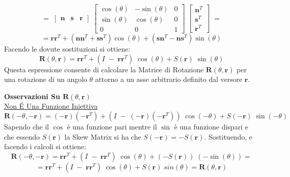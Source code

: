 ﻿\documentclass[11pt, a4paper]{article}
\begin{document}
\[
    =
    \;
    \begin{bmatrix}
        \mathbf{n} & \mathbf{s} & \mathbf{r}
    \end{bmatrix}
    \;
    \begin{bmatrix}
       \cos(\theta) & -\sin(\theta) & 0 \\
       \sin(\theta) &  \cos(\theta) & 0 \\
       0 & 0 & 1
    \end{bmatrix}
    \;
    \begin{bmatrix}
        \mathbf{n}^{T}\\
        \mathbf{s}^{T}\\
        \mathbf{r}^{T}
    \end{bmatrix}
    \;
    =
\]
\[
    = \mathbf{r}\mathbf{r}^{T} + (\mathbf{n}\mathbf{n}^{T} + \mathbf{s}\mathbf{s}^{T})\cos(\theta) + (\mathbf{s}\mathbf{n}^{T} - \mathbf{n}\mathbf{s}^{T})\sin(\theta)
\]
Facendo le dovute sostituzioni si ottiene:
\[
    \boxed{\mathbf{R}(\theta, \mathbf{r}) = \mathbf{r}\mathbf{r}^{T} + (I \; - \; \mathbf{r}\mathbf{r}^{T}) \; \cos(\theta) + S(\mathbf{r}) \; \sin(\theta)}
\]
Questa espressione consente di calcolare la Matrice di Rotazione \(\mathbf{R}(\theta, \mathbf{r})\) per una rotazione di un angolo \(\theta\) attorno a un asse arbitrario definito dal versore \(\mathbf{r}\).

\newpage
\textbf{Osservazioni Su \(\mathbf{R}(\theta, \mathbf{r})\)}\\

\underline{Non É Una Funzione Iniettiva}
\[
    \mathbf{R}(-\theta, -\mathbf{r}) =  (-\mathbf{r})(-\mathbf{r}^{T}) + (I \; - \; (-\mathbf{r})(-\mathbf{r}^{T})) \; \cos(-\theta) + S(\mathbf{-r}) \; \sin(-\theta)
\]
Sapendo che il $\cos$ è una funzione pari mentre il $\sin$ è una funzione dispari e che essendo $S(\mathbf{r})$ la Skew Matrix si ha che $S(\mathbf{-r}) = - S(\mathbf{r})$. Sostituendo, e facendo i calcoli si ottiene:
\[
    \mathbf{R}(-\theta, -\mathbf{r}) =  \mathbf{r}\mathbf{r}^{T} + (I \; - \; \mathbf{r}\mathbf{r}^{T}) \; \cos(\theta) + (-S(\mathbf{r})) \; (-\sin(\theta)) =
\]
\[
    = \mathbf{r}\mathbf{r}^{T} + (I \; - \; \mathbf{r}\mathbf{r}^{T}) \; \cos(\theta) + S(\mathbf{r}) \; sin(\theta) = \mathbf{R}(\theta, \mathbf{r})
\]
\end{document}
